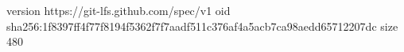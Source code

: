 version https://git-lfs.github.com/spec/v1
oid sha256:1f8397ff4f77f8194f5362f7f7aadf511c376af4a5acb7ca98aedd65712207dc
size 480
